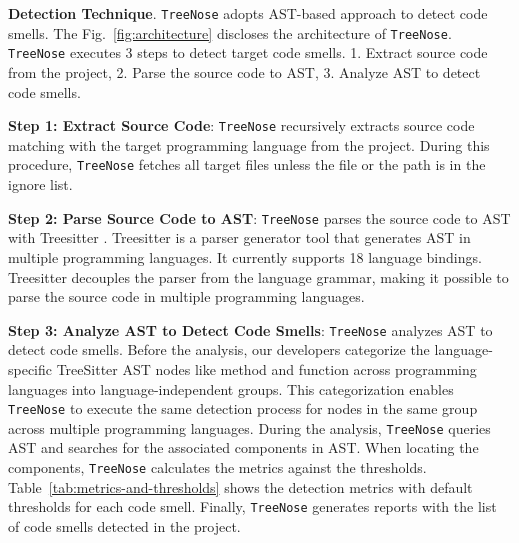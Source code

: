 {\bf Detection Technique}. \texttt{TreeNose} adopts AST-based approach to detect
code smells. The Fig.~\ref{fig:architecture} discloses the architecture of
\texttt{TreeNose}. \texttt{TreeNose} executes 3 steps to detect target code
smells. 1. Extract source code from the project, 2. Parse the source code to
AST, 3. Analyze AST to detect code smells.

\textbf{Step 1: Extract Source Code}: \texttt{TreeNose} recursively extracts
source code matching with the target programming language from the
project. During this procedure, \texttt{TreeNose} fetches all target files
unless the file or the path is in the ignore list.

\textbf{Step 2: Parse Source Code to AST}: \texttt{TreeNose} parses the source
code to AST with Treesitter \cite{treeSitter}. Treesitter is a parser generator
tool that generates AST in multiple programming languages. It currently
supports 18 language bindings. Treesitter decouples the parser from the
language grammar, making it possible to parse the source code in multiple
programming languages.

\textbf{Step 3: Analyze AST to Detect Code Smells}: \texttt{TreeNose} analyzes
AST to detect code smells. Before the analysis, our developers categorize the
language-specific TreeSitter AST nodes like method and function across
programming languages into language-independent groups. This categorization
enables \texttt{TreeNose} to execute the same detection process for nodes in
the same group across multiple programming languages. During the analysis,
\texttt{TreeNose} queries AST and searches for the associated components in
AST. When locating the components, \texttt{TreeNose} calculates the metrics
against the thresholds. Table~\ref{tab:metrics-and-thresholds} shows the
detection metrics with default thresholds for each code smell. Finally,
\texttt{TreeNose} generates reports with the list of code smells detected in
the project.


